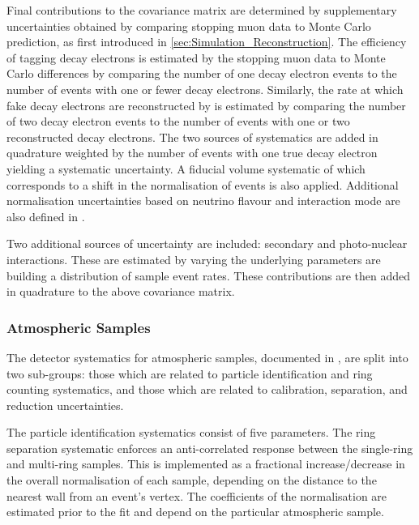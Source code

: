Final contributions to the covariance matrix are determined by supplementary uncertainties obtained by comparing stopping muon data to Monte Carlo prediction, as first introduced in \autoref{sec:Simulation_Reconstruction}. The efficiency of tagging decay electrons is estimated by the stopping muon data to Monte Carlo differences by comparing the number of one decay electron events to the number of events with one or fewer decay electrons. Similarly, the rate at which fake decay electrons are reconstructed by \fq is estimated by comparing the number of two decay electron events to the number of events with one or two reconstructed decay electrons. The two sources of systematics are added in quadrature weighted by the number of events with one true decay electron yielding a  systematic uncertainty.
A fiducial volume systematic of  which corresponds to a  shift in the normalisation of events is also applied. Additional normalisation uncertainties based on neutrino flavour and interaction mode are also defined in \cite{t2k_tn_399, t2k_tn_186, t2k_tn_107}.

Two additional sources of uncertainty are included: secondary and photo-nuclear interactions. These are estimated by varying the underlying parameters are building a distribution of sample event rates. These contributions are then added in quadrature to the above covariance matrix.


\subsubsection{Atmospheric Samples}
\label{sec:SelsAndSysts_Systs_FDAtm}

The detector systematics for atmospheric samples, documented in \cite{Jiang2019-iw}, are split into two sub-groups: those which are related to particle identification and ring counting systematics, and those which are related to calibration, separation, and reduction uncertainties.

The particle identification systematics consist of five parameters. The ring separation systematic enforces an anti-correlated response between the single-ring and multi-ring samples. This is implemented as a fractional increase/decrease in the overall normalisation of each sample, depending on the distance to the nearest wall from an event's vertex. The coefficients of the normalisation are estimated prior to the fit and depend on the particular atmospheric sample.

